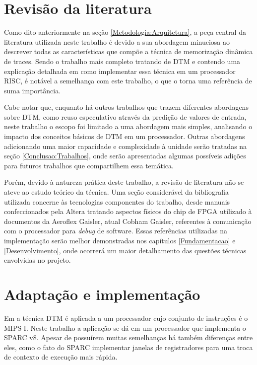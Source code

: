 \section{Revisão da literatura}
\label{Metodologia:Literatura}

Como dito anteriormente na seção \ref{Metodologia:Arquitetura}, a peça central da literatura utilizada neste trabalho é  devido a sua abordagem minuciosa ao descrever todas as características que compõe a técnica de memorização dinâmica de traces. Sendo o trabalho mais completo tratando de DTM e contendo uma explicação detalhada em como implementar essa técnica em um processador RISC, é notável a semelhança com este trabalho, o que o torna uma referência de suma importância.

Cabe notar que, enquanto há outros trabalhos que trazem diferentes abordagens sobre DTM, como reuso especulativo através da predição de valores de entrada, neste trabalho o escopo foi limitado a uma abordagem mais simples, analisando o impacto dos conceitos básicos de DTM em um processador. Outras abordagens adicionando uma maior capacidade e complexidade à unidade serão tratadas na seção \ref{Conclusao:Trabalhos}, onde serão apresentadas algumas possíveis adições para futuros trabalhos que compartilhem essa temática.



Porém, devido à natureza prática deste trabalho, a revisão de literatura não se ateve ao estudo teórico da técnica. Uma seção considerável da bibliografia utilizada concerne às tecnologias componentes do trabalho, desde manuais confeccionados pela Altera tratando aspectos físicos do chip de FPGA utilizado à documentos da Aeroflex Gaisler, atual Cobham Gaisler, referentes à comunicação com o processador para \textit{debug} de software. Essas referências utilizadas na implementação serão melhor demonstradas nos capítulos \ref{Fundamentacao} e \ref{Desenvolvimento}, onde ocorrerá um maior detalhamento das questões técnicas envolvidas no projeto.


\section{Adaptação e implementação}
\label{Metodologia:Implementacao}

Em  a técnica DTM é aplicada a um processador cujo conjunto de instruções é o MIPS I. Neste trabalho a aplicação se dá em um processador que implementa o SPARC v8. Apesar de possuírem muitas semelhanças há também diferenças entre eles, como o fato do SPARC implementar janelas de registradores para uma troca de contexto de execução mais rápida.

